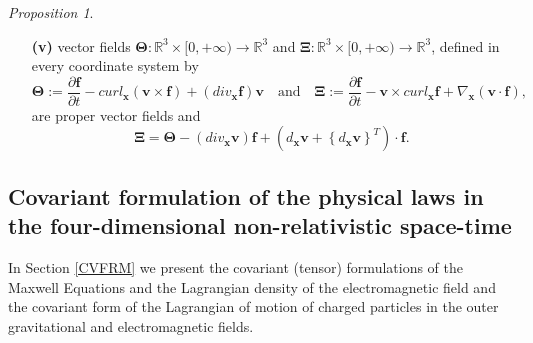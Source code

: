 \documentclass{article}
\newtheorem{proposition}{Proposition}[section]
\theoremstyle{definition}
\theoremstyle{remark}
\renewcommand{\vec}[1]{\mathbf{#1}}
\newcommand{\R}{\mathbb{R}}
\newcommand{\R}{{\mathbb{R}}}
\newtheorem{proposition}{Proposition}
\begin{document}
\begin{proposition}
\begin{itemize}
\item[{\bf(v)}] vector fields $\vec\Theta:\R^3\times[0,+\infty)\to\R^3$ and $\vec\Xi:\R^3\times[0,+\infty)\to\R^3$, defined
in every coordinate system by
\begin{equation}\label{vfyutuyfffhhgfhgfhint}
\vec\Theta:=\frac{\partial \vec f}{\partial t}- curl_{\vec
x}\left(\vec v\times \vec f\right)+\left({div}_{\vec x}\vec
f\right)\vec v\quad\text{and}\quad \vec\Xi:=\frac{\partial \vec
f}{\partial t}- \vec v\times curl_{\vec x}\vec f+\nabla_{\vec
x}\left(\vec v\cdot\vec f\right),
\end{equation}
are proper vector fields and
\begin{equation}
\label{vhfffngghhjghhgjlkhjhkPPPint} \vec\Xi
=
\vec\Theta-\left(div_{\vec x}\vec v\right)\vec f+ \left(d_{\vec
x}\vec v+\left\{d_{\vec x}\vec v\right\}^T\right)\cdot\vec f.
\end{equation}
\end{itemize}
\end{proposition}



































\subsection{Covariant formulation of the physical laws in the
four-dimensional non-relativistic space-time} In Section \ref{CVFRM}
we present the covariant (tensor) formulations of the Maxwell
Equations and the Lagrangian density of the electromagnetic field
and the covariant form of the Lagrangian of motion of charged
particles in the outer gravitational and electromagnetic fields.
\end{document}
